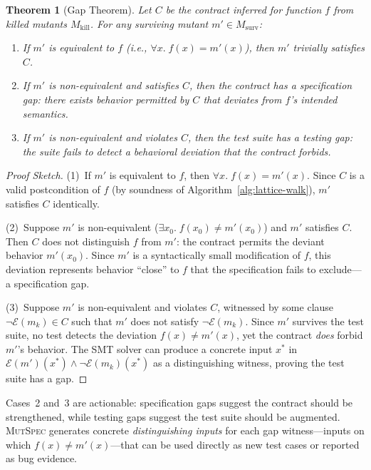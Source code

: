 \documentclass[11pt]{article}
\newtheorem{theorem}{Theorem}
\begin{document}
\begin{theorem}[Gap Theorem]
\label{thm:gap}
Let $C$ be the contract inferred for function $f$ from killed mutants
$M_{\mathrm{kill}}$. For any surviving mutant $m' \in M_{\mathrm{surv}}$:
\begin{enumerate}[leftmargin=*]
  \item If $m'$ is equivalent to $f$ (i.e., $\forall x.\; f(x) = m'(x)$), then
    $m'$ trivially satisfies $C$.
  \item If $m'$ is non-equivalent and satisfies $C$, then the contract has a
    \emph{specification gap}: there exists behavior permitted by $C$ that
    deviates from $f$'s intended semantics.
  \item If $m'$ is non-equivalent and violates $C$, then the test suite has a
    \emph{testing gap}: the suite fails to detect a behavioral deviation that
    the contract forbids.
\end{enumerate}
\end{theorem}

\begin{proof}[Proof Sketch]
(1)~If $m'$ is equivalent to $f$, then $\forall x.\; f(x) = m'(x)$. Since
$C$ is a valid postcondition of $f$ (by soundness of Algorithm~\ref{alg:lattice-walk}),
$m'$ satisfies $C$ identically.

(2)~Suppose $m'$ is non-equivalent ($\exists x_0.\; f(x_0) \neq m'(x_0)$) and
$m'$ satisfies $C$. Then $C$ does not distinguish $f$ from $m'$: the contract
permits the deviant behavior $m'(x_0)$. Since $m'$ is a syntactically small
modification of $f$, this deviation represents behavior ``close'' to $f$ that
the specification fails to exclude---a specification gap.

(3)~Suppose $m'$ is non-equivalent and violates $C$, witnessed by some clause
$\neg\mathcal{E}(m_k) \in C$ such that $m'$ does not satisfy
$\neg\mathcal{E}(m_k)$. Since $m'$ survives the test suite, no test detects
the deviation $f(x) \neq m'(x)$, yet the contract \emph{does} forbid
$m'$'s behavior. The SMT solver can produce a concrete input $x^*$ in
$\mathcal{E}(m')(x^*) \land \neg\mathcal{E}(m_k)(x^*)$ as a distinguishing
witness, proving the test suite has a gap.
\end{proof}

Cases~2 and~3 are actionable: specification gaps suggest the contract should be
strengthened, while testing gaps suggest the test suite should be augmented.
\textsc{MutSpec} generates concrete \emph{distinguishing inputs} for each gap
witness---inputs on which $f(x) \neq m'(x)$---that can be used directly as new
test cases or reported as bug evidence.
\end{document}
